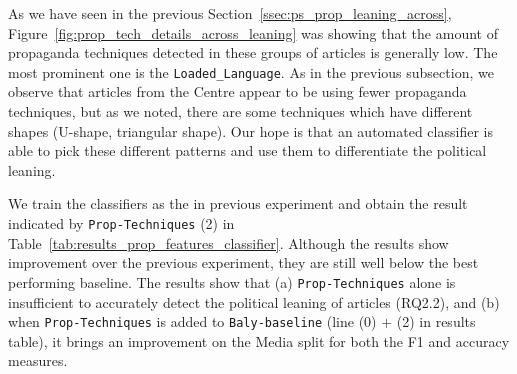 As we have seen in the previous Section~\ref{ssec:ps_prop_leaning_across},  Figure~\ref{fig:prop_tech_details_across_leaning} was showing that the amount of propaganda techniques detected in these groups of articles is generally low. The most prominent one is the \texttt{Loaded\_Language}.
As in the previous subsection, we observe that articles from the Centre appear to be using fewer propaganda techniques, %
but as we noted, there are some techniques which have different shapes (U-shape, triangular shape). Our hope is that an automated classifier is able to pick these different patterns and use them to differentiate the political leaning. 






We train the classifiers as the in previous experiment and obtain the result indicated by \texttt{Prop-Techniques} (2) in Table~\ref{tab:results_prop_features_classifier}. Although the results show improvement over the previous experiment, they are still well below the best performing baseline. %
The results show that (a) \texttt{Prop-Techniques} alone is insufficient to accurately detect the political leaning of articles (RQ2.2), and (b) when \texttt{Prop-Techniques} is added to \texttt{Baly-baseline} (line (0) + (2) in results table), it brings an improvement on the Media split for both the F1 and accuracy measures. 



